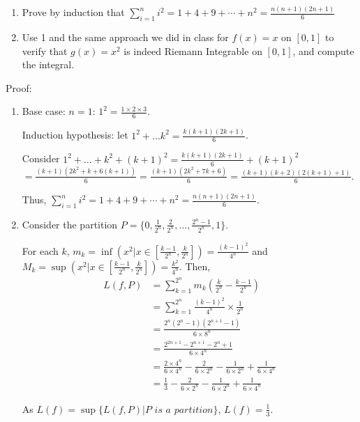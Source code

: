 \documentclass{article}
\begin{document}
\begin{enumerate}
\item Prove by induction that $\sum\limits_{i=1}^ni^2=1+4+9+\cdots+n^2=\frac{n(n+1)(2n+1)}{6}$
\item Use 1 and the same approach we did in class for $f(x)=x$ on $[0,1]$ to verify that $g(x)=x^2$ is indeed Riemann Integrable on $[0,1]$, and compute the integral.
\end{enumerate}

Proof:
\begin{enumerate}
    \item Base case: $n = 1$: $1^2 = \frac{1\times 2\times 3}{6}$.
    
    Induction hypothesis: let $1^2 + \dots k^2 = \frac{k(k+1)(2k+1)}{6}$.
    
    Consider $1^2 + \dots + k^2 + (k+1)^2 = \frac{k(k+1)(2k+1)}{6} + (k+1)^2$\\$ = \frac{(k+1)(2k^2+k + 6(k+1))}{6} = \frac{(k+1)(2k^2 + 7k + 6)}{6} = \frac{(k+1)(k+2)(2(k+1)+1)}{6}$.

    Thus, $\sum\limits_{i=1}^ni^2=1+4+9+\cdots+n^2=\frac{n(n+1)(2n+1)}{6}$.

    \item Consider the partition $ P = \{0, \frac{1}{2^n}, \frac{2}{2^n}, \dots , \frac{2^n-1}{2^n}, 1\}$.

    For each $k$, $m_k = \inf(x^2|x \in [\frac{k-1}{2^n}, \frac{k}{2^n}]) = \frac{(k-1)^2}{4^n}$ and $M_k = \sup(x^2|x \in [\frac{k-1}{2^n}, \frac{k}{2^n}]) = \frac{k^2}{4^n}$.
    Then, 
    \begin{align*}
        L(f, P) & = \sum\limits_{k=1}^{2^n} m_k(\frac{k}{2^n} - \frac{k-1}{2^n}) \\
        & = \sum\limits_{k=1}^{2^n} \frac{(k-1)^2}{4^n} \times \frac{1}{2^n} \\
        & = \frac{2^n(2^n-1)(2^{n+1}-1)}{6\times8^n} \\
        & = \frac{2^{2n+1} -2^{n+1} - 2^n +1}{6\times4^n} \\
        & = \frac{2\times4^n}{6\times4^n} - \frac{2}{6\times2^n} - \frac{1}{6\times2^n} + \frac{1}{6\times 4^n} \\
        & = \frac{1}{3} - \frac{2}{6\times2^n} - \frac{1}{6\times2^n} + \frac{1}{6\times 4^n}
    \end{align*}
    

    As $L(f) = \sup\{ L(f, P) | P \textit{ is a partition}\}$, $L(f) = \frac{1}{3}$.


\end{enumerate}
\end{document}
